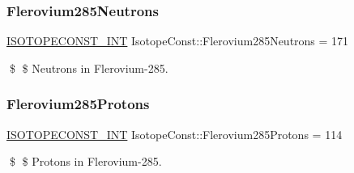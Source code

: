 \subsubsection{\texorpdfstring{Flerovium285\+Neutrons}{Flerovium285Neutrons}}
{\footnotesize\ttfamily \mbox{\hyperlink{group___isotope_const-_macros_ga5f18360b3e99483a35c32d789e62621c}{I\+S\+O\+T\+O\+P\+E\+C\+O\+N\+S\+T\+\_\+\+I\+NT}} Isotope\+Const\+::\+Flerovium285\+Neutrons = 171}

\$ \$ Neutrons in Flerovium-\/285. \mbox{\label{group___isotope_const-_flerovium-_fl285_ga663db8f899d7d164d4fb44665d5239a6}} 
\subsubsection{\texorpdfstring{Flerovium285\+Protons}{Flerovium285Protons}}
{\footnotesize\ttfamily \mbox{\hyperlink{group___isotope_const-_macros_ga5f18360b3e99483a35c32d789e62621c}{I\+S\+O\+T\+O\+P\+E\+C\+O\+N\+S\+T\+\_\+\+I\+NT}} Isotope\+Const\+::\+Flerovium285\+Protons = 114}

\$ \$ Protons in Flerovium-\/285. 